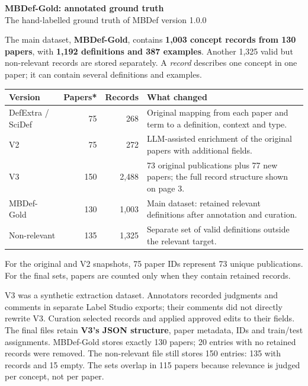 \documentclass[10pt,a4paper]{article}
\newcommand{\smallhead}[1]{\vspace{7pt}{\large\bfseries #1}\par\vspace{2pt}}
\begin{document}
\begin{center}
{\LARGE\bfseries MBDef-Gold: annotated ground truth}\\[5pt]
{\small The hand-labelled ground truth of MBDef \enspace\textperiodcentered\enspace version 1.0.0}
\end{center}
\vspace{-4pt}
The main dataset, \textbf{MBDef-Gold}, contains \textbf{1,003 concept records from 130 papers},
with \textbf{1,192 definitions and 387 examples}. Another 1,325 valid but non-relevant
records are stored separately. A \emph{record} describes one concept in one paper;
it can contain several definitions and examples.

\smallhead{From the original JSON to the final JSON}
\begin{tabularx}{\linewidth}{@{}lrrY@{}}
\toprule
Version & Papers* & Records & What changed \\
\midrule
DefExtra / SciDef & 75 & 268 & Original mapping from each paper and term to a definition, context and type. \\
V2 & 75 & 272 & LLM-assisted enrichment of the original papers with additional fields. \\
V3 & 150 & 2,488 & 73 original publications plus 77 new papers; the full record structure shown on page 3. \\
MBDef-Gold & 130 & 1,003 & Main dataset: retained relevant definitions after annotation and curation. \\
Non-relevant & 135 & 1,325 & Separate set of valid definitions outside the relevant target. \\
\bottomrule
\end{tabularx}
{\footnotesize *For the original and V2 snapshots, 75 paper IDs represent 73 unique publications.
For the final sets, papers are counted only when they contain retained records.}

V3 was a synthetic extraction dataset. Annotators recorded judgments and comments
in separate Label Studio exports; their comments did not directly rewrite V3.
Curation selected records and applied approved edits to their fields. The final
files retain \textbf{V3's JSON structure}, paper metadata, IDs and train/test assignments.
MBDef-Gold stores exactly 130 papers; 20 entries with no retained records were removed.
The non-relevant file still stores 150 entries: 135 with records and 15 empty. The sets
overlap in 115 papers because relevance is judged per concept, not per paper.
\end{document}
